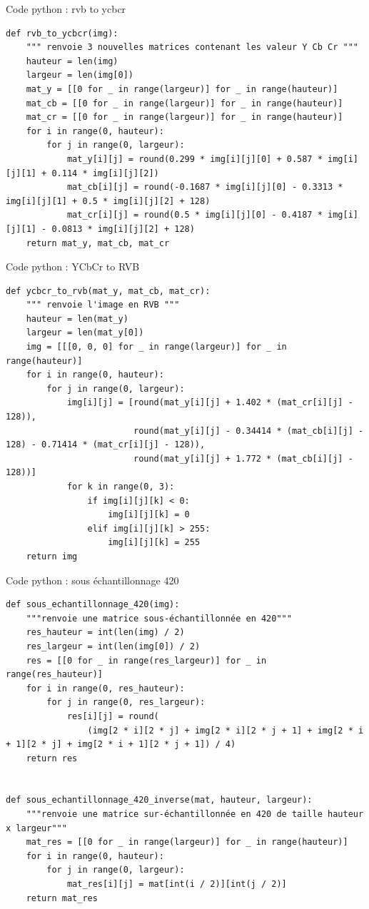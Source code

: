 \documentclass[xcolor=dvipsnames]{beamer}
\begin{document}
\begin{frame}[fragile]{Code python : rvb to ycbcr}
    \begin{lstlisting}[style=pythonStyle]
def rvb_to_ycbcr(img):
    """ renvoie 3 nouvelles matrices contenant les valeur Y Cb Cr """
    hauteur = len(img)
    largeur = len(img[0])
    mat_y = [[0 for _ in range(largeur)] for _ in range(hauteur)]
    mat_cb = [[0 for _ in range(largeur)] for _ in range(hauteur)]
    mat_cr = [[0 for _ in range(largeur)] for _ in range(hauteur)]
    for i in range(0, hauteur):
        for j in range(0, largeur):
            mat_y[i][j] = round(0.299 * img[i][j][0] + 0.587 * img[i][j][1] + 0.114 * img[i][j][2])
            mat_cb[i][j] = round(-0.1687 * img[i][j][0] - 0.3313 * img[i][j][1] + 0.5 * img[i][j][2] + 128)
            mat_cr[i][j] = round(0.5 * img[i][j][0] - 0.4187 * img[i][j][1] - 0.0813 * img[i][j][2] + 128)
    return mat_y, mat_cb, mat_cr
    \end{lstlisting}
\end{frame}

\begin{frame}[fragile]{Code python : YCbCr to RVB}
    \begin{lstlisting}[style=pythonStyle]
def ycbcr_to_rvb(mat_y, mat_cb, mat_cr):
    """ renvoie l'image en RVB """
    hauteur = len(mat_y)
    largeur = len(mat_y[0])
    img = [[[0, 0, 0] for _ in range(largeur)] for _ in range(hauteur)]
    for i in range(0, hauteur):
        for j in range(0, largeur):
            img[i][j] = [round(mat_y[i][j] + 1.402 * (mat_cr[i][j] - 128)),
                         round(mat_y[i][j] - 0.34414 * (mat_cb[i][j] - 128) - 0.71414 * (mat_cr[i][j] - 128)),
                         round(mat_y[i][j] + 1.772 * (mat_cb[i][j] - 128))]
            for k in range(0, 3):
                if img[i][j][k] < 0:
                    img[i][j][k] = 0
                elif img[i][j][k] > 255:
                    img[i][j][k] = 255
    return img
    \end{lstlisting}
\end{frame}

\begin{frame}[fragile]{Code python : sous échantillonnage 420}
    \begin{lstlisting}[style=pythonStyle]
def sous_echantillonnage_420(img):
    """renvoie une matrice sous-échantillonnée en 420"""
    res_hauteur = int(len(img) / 2)
    res_largeur = int(len(img[0]) / 2)
    res = [[0 for _ in range(res_largeur)] for _ in range(res_hauteur)]
    for i in range(0, res_hauteur):
        for j in range(0, res_largeur):
            res[i][j] = round(
                (img[2 * i][2 * j] + img[2 * i][2 * j + 1] + img[2 * i + 1][2 * j] + img[2 * i + 1][2 * j + 1]) / 4)
    return res


def sous_echantillonnage_420_inverse(mat, hauteur, largeur):
    """renvoie une matrice sur-échantillonnée en 420 de taille hauteur x largeur"""
    mat_res = [[0 for _ in range(largeur)] for _ in range(hauteur)]
    for i in range(0, hauteur):
        for j in range(0, largeur):
            mat_res[i][j] = mat[int(i / 2)][int(j / 2)]
    return mat_res
    \end{lstlisting}
\end{frame}
\end{document}
